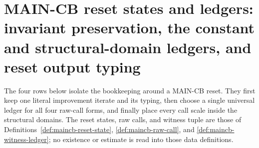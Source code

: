 \section{MAIN-CB reset states and ledgers: invariant preservation, the constant and structural-domain ledgers, and reset output typing}\label{sec:maincb-reset-ledgers}

The four rows below isolate the bookkeeping around a MAIN-CB reset.  They first keep one
literal improvement iterate and its typing, then choose a single universal ledger for all
four raw-call forms, and finally place every call scale inside the structural domains.
The reset states, raw calls, and witness tuple are those of
Definitions~\ref{def:maincb-reset-state}, \ref{def:maincb-raw-call}, and
\ref{def:maincb-witness-ledger}; no existence or estimate is read into those data definitions.

